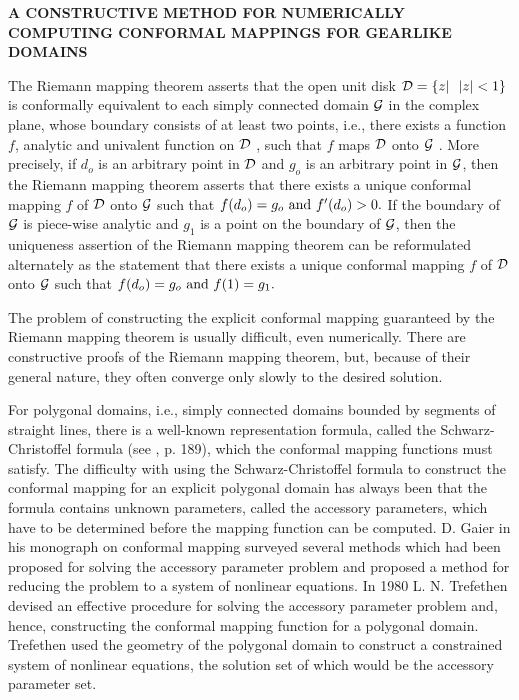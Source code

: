 \documentclass[12pt]{article}%
\begin{document}
\baselineskip=18pt
\begin{center}
{\large \bf A CONSTRUCTIVE METHOD FOR NUMERICALLY COMPUTING CONFORMAL
MAPPINGS FOR GEARLIKE DOMAINS}
\end{center}
\vspace*{.5in}


\vspace*{12pt}

The Riemann mapping theorem asserts that the 
open unit disk  ${\cal D}  = \{z | \  \  |z| < 1\}$ is conformally equivalent to 
each simply connected domain  ${\cal G}$  in the complex plane, whose 
boundary consists of at least two points, i.e., there exists a 
function $f$, analytic and univalent function on  ${\cal D}$ , such that $f$ 
maps  ${\cal D}$  onto  ${\cal G}$ .  More precisely, if $d_o$  is an
arbitrary point in  ${\cal D}$  
and $g_o$  is an arbitrary point in  ${\cal G}$, then the Riemann mapping 
theorem asserts that there exists a unique conformal mapping $f$ of 
 ${\cal D}$  onto  ${\cal G}$  such that $f(d_o) = g_o  \  {\rm and} \  f'(d_o) > 0.$  If the boundary of 
 ${\cal G}$  is piece-wise analytic and $g_1$  is a point on the
boundary of  ${\cal G}$, 
then the uniqueness assertion of the Riemann mapping theorem can 
be reformulated alternately as the statement that there exists a
unique conformal  mapping $f$ of  ${\cal D}$ onto  ${\cal G}$ such
that $f(d_o) = g_o \   {\rm and} \  f(1) = g_1 .$

The problem of constructing the explicit conformal mapping 
guaranteed by the Riemann mapping theorem is usually difficult, 
even numerically.  There are constructive proofs \cite{6} of the 
Riemann mapping theorem, but, because of their general nature, 
they often converge only slowly to the desired solution.

For polygonal domains, i.e., simply connected domains bounded by
segments of straight lines, there is a well-known representation
formula, called the Schwarz-Christoffel formula (see \cite{7}, p.
189), which the conformal mapping functions must satisfy.  The
difficulty with using the Schwarz-Christoffel formula to construct
the conformal mapping for an explicit polygonal domain has always
been that the formula contains unknown parameters, called the
accessory parameters, which have to be determined before the mapping
function can be computed.  D. Gaier in his monograph \cite{Ga} on
conformal mapping surveyed several methods which had been proposed for
solving the accessory parameter problem and proposed a method for
reducing the problem to a system of nonlinear
equations.  In 1980 L. N. Trefethen \cite{10} devised an effective
procedure for solving the accessory parameter problem and, hence,
constructing the conformal mapping function for a polygonal domain.
Trefethen used the geometry of the polygonal domain to construct a
constrained system of nonlinear equations, the solution set of which
would be the accessory parameter set.
\end{document}
